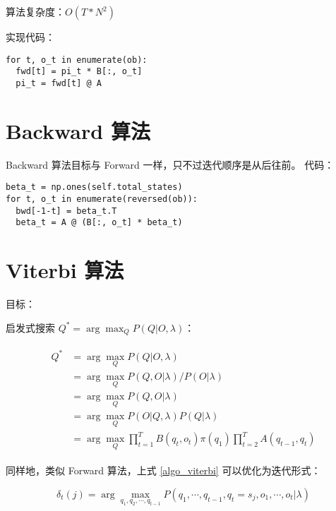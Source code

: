 \documentclass[degree=project, degree-type=project]{thuthesis}
\begin{document}
  算法复杂度：$O(T * N^2)$

  实现代码：

  \begin{verbatim}
for t, o_t in enumerate(ob):
  fwd[t] = pi_t * B[:, o_t]
  pi_t = fwd[t] @ A
  \end{verbatim}


\section{Backward 算法}

Backward 算法目标与 Forward 一样，只不过迭代顺序是从后往前。
代码：

  \begin{verbatim}
beta_t = np.ones(self.total_states)
for t, o_t in enumerate(reversed(ob)):
  bwd[-1-t] = beta_t.T
  beta_t = A @ (B[:, o_t] * beta_t)
  \end{verbatim}

\section{Viterbi 算法}

目标：

启发式搜索 $Q^* = \arg \max_Q P(Q | O, \lambda)$：

\begin{align}
  \begin{split}
    Q^* &= \arg \max_Q P(Q | O, \lambda) \\
    &= \arg \max_Q P(Q, O | \lambda) / P(O | \lambda) \\
    &= \arg \max_Q P(Q, O | \lambda) \\
    &= \arg \max_Q P(O | Q, \lambda) P(Q | \lambda) \\
    &= \arg \max_Q \prod_{t=1}^T B(q_t, o_t) \pi(q_1) \prod_{t=2}^T A(q_{t-1}, q_t)
  \end{split}
  \label{algo_viterbi}
\end{align}

同样地，类似 Forward 算法，上式 \ref{algo_viterbi} 可以优化为迭代形式：

\begin{equation}
\delta_t (j) = \arg \max_{q_1, q_2, \cdots, q_{t-1}} P(q_1, \cdots, q_{t-1}, q_t=s_j, o_1, \cdots, o_t | \lambda)
\end{equation}
\end{document}
